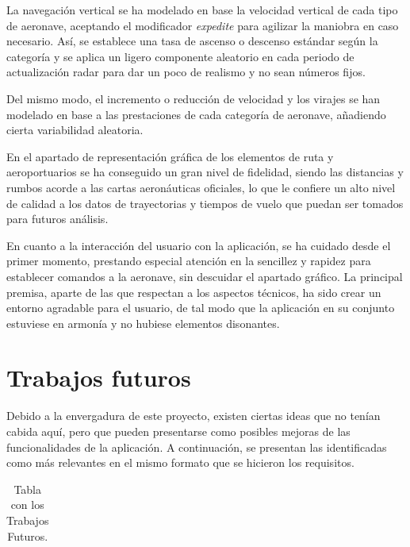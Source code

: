 La navegación vertical se ha modelado en base la velocidad vertical de cada tipo de aeronave, aceptando el modificador \textit{expedite} para agilizar la maniobra en caso necesario. Así, se establece una tasa de ascenso o descenso estándar según la categoría y se aplica un ligero componente aleatorio en cada periodo de actualización radar para dar un poco de realismo y no sean números fijos.

Del mismo modo, el incremento o reducción de velocidad y los virajes se han modelado en base a las prestaciones de cada categoría de aeronave, añadiendo cierta variabilidad aleatoria.

En el apartado de representación gráfica de los elementos de ruta y aeroportuarios se ha conseguido un gran nivel de fidelidad, siendo las distancias y rumbos acorde a las cartas aeronáuticas oficiales, lo que le confiere un alto nivel de calidad a los datos de trayectorias y tiempos de vuelo que puedan ser tomados para futuros análisis.


En cuanto a la interacción del usuario con la aplicación, se ha cuidado desde el primer momento, prestando especial atención en la sencillez y rapidez para establecer comandos a la aeronave, sin descuidar el apartado gráfico. La principal premisa, aparte de las que respectan a los aspectos técnicos, ha sido crear un entorno agradable para el usuario, de tal modo que la aplicación en su conjunto estuviese en armonía y no hubiese elementos disonantes.


\clearpage

\section{Trabajos futuros}
\label{sec:trabajos-futuros}

Debido a la envergadura de este proyecto, existen ciertas ideas que no tenían cabida aquí, pero que pueden presentarse como posibles mejoras de las funcionalidades de la aplicación. A continuación, se presentan las identificadas como más relevantes en el mismo formato que se hicieron los requisitos.


\setcounter{TF_index}{1}

\begin{table}[!hbtp]
	\footnotesize
	\setlength{\arrayrulewidth}{0.4mm}
	\renewcommand{\arraystretch}{1.2}
	\begin{center}
		\caption{Tabla con los Trabajos Futuros.}
		\label{tab:Fase1}
		\begin{tabular}{|c|}
			\hline 
			\hspace{4.4cm}
			{\cellcolor{gray!30}{\textbf{TRABAJOS FUTUROS}}}
			\hspace{4.4cm}
			\\ 
			\hline
		\end{tabular}
	\end{center}
\end{table}

